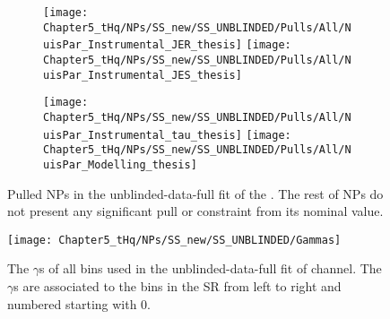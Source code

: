 \begin{figure}[h]
\centering
\begin{subfigure}{.52\textwidth}
  \centering
  \texttt{[image: Chapter5\_tHq/NPs/SS\_new/SS\_UNBLINDED/Pulls/All/NuisPar\_Instrumental\_JER\_thesis]}
   \texttt{[image: Chapter5\_tHq/NPs/SS\_new/SS\_UNBLINDED/Pulls/All/NuisPar\_Instrumental\_JES\_thesis]}
\end{subfigure}%
\begin{subfigure}{.48\textwidth}
  \centering
  \texttt{[image: Chapter5\_tHq/NPs/SS\_new/SS\_UNBLINDED/Pulls/All/NuisPar\_Instrumental\_tau\_thesis]}
   \texttt{[image: Chapter5\_tHq/NPs/SS\_new/SS\_UNBLINDED/Pulls/All/NuisPar\_Modelling\_thesis]}
\end{subfigure}
\caption{Pulled NPs in the unblinded-data-full fit of the \dilepSStau. 
The rest of NPs do not present any significant pull or constraint from its nominal value.}  
\label{fig:ChaptH:fitToData:SS:PulledNPs}
\end{figure}


\begin{figure}[h]
\centering
 \texttt{[image: Chapter5\_tHq/NPs/SS\_new/SS\_UNBLINDED/Gammas]}
\caption{The $\gamma$s of all bins used in the unblinded-data-full fit of \dilepSStau channel.
The $\gamma$s are associated to the bins in the SR from left to right
and numbered starting with 0.} 
\label{fig:ChaptH:fitToData:SS:Gammas}
\end{figure}

